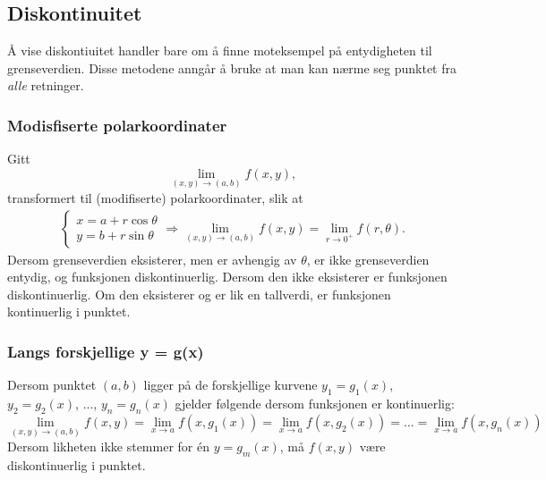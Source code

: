 \documentclass[fleqn,12pt]{wlscirep}
\begin{document}
\subsection{Diskontinuitet}
Å vise diskontiuitet handler bare om å finne moteksempel på entydigheten til grenseverdien. Disse metodene anngår å bruke at man kan nærme seg punktet fra \textit{alle} retninger. 
\subsubsection{Modisfiserte polarkoordinater}
Gitt 
\begin{equation}
    \lim_{(x,y)\to (a,b)} f(x,y),
\end{equation} 
transformert til (modifiserte) polarkoordinater, slik at
\begin{align}
        \begin{cases}
        x = a + r \cos{\theta}\\
        y = b + r \sin{\theta}
        \end{cases}
        \Longrightarrow \lim_{(x,y)\to (a,b)} f(x,y) = \lim_{r \to 0^+} f(r,\theta).
\end{align}
Dersom grenseverdien eksisterer, men er avhengig av $\theta$, er ikke grenseverdien entydig, og funksjonen diskontinuerlig. Dersom den ikke eksisterer er funksjonen diskontinuerlig. Om den eksisterer og er lik en tallverdi, er funksjonen kontinuerlig i punktet.
\subsubsection{Langs forskjellige y = g(x)}
Dersom punktet $(a,b)$ ligger på de forskjellige kurvene $y_1 = g_1(x)$, $y_2 = g_2(x)$, ..., $y_n = g_n(x)$ gjelder følgende dersom funksjonen er kontinuerlig:
\begin{equation}
    \lim_{(x,y)\to (a,b)} f(x,y) = \lim_{x\to a} f(x,g_1(x)) = \lim_{x\to a} f(x,g_2(x)) = ... = \lim_{x\to a} f(x,g_n(x))
\end{equation}
Dersom likheten ikke stemmer for én $y=g_m(x)$, må $f(x,y)$ være diskontinuerlig i punktet.
\end{document}
